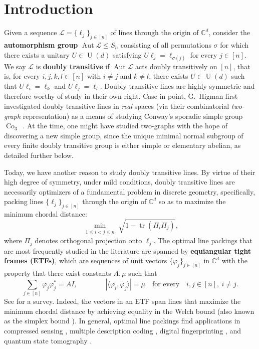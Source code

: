 \documentclass[11pt]{article}
\theoremstyle{definition}
\numberwithin{equation}{section}
\begin{document}
\section{Introduction}


Given a sequence $\mathscr{L} = \{\ell_j\}_{j\in [n]}$ of lines through the origin of $\mathbb{C}^d$, consider the \textbf{automorphism group} $\operatorname{Aut}\mathscr{L} \leq S_n$ consisting of all permutations $\sigma$ for which there exists a unitary $U \in \operatorname{U}(d)$ satisfying $U \ell_j = \ell_{\sigma(j)}$ for every $j \in [n]$.
We say $\mathscr{L}$ is \textbf{doubly transitive} if $\operatorname{Aut} \mathscr{L}$ acts doubly transitively on $[n]$, that is, for every $i,j,k,l\in[n]$ with $i\neq j$ and $k\neq l$, there exists $U\in\operatorname{U}(d)$ such that $U\ell_i=\ell_k$ and $U\ell_j=\ell_l$.
Doubly transitive lines are highly symmetric and therefore worthy of study in their own right.
Case in point, G.~Higman first investigated doubly transitive lines in \textit{real} spaces (via their combinatorial \textit{two-graph} representation) as a means of studying Conway's sporadic simple group $\operatorname{Co}_3$~\cite{Taylor:77}.
At the time, one might have studied two-graphs with the hope of discovering a new simple group, since the unique minimal normal subgroup of every finite doubly transitive group is either simple or elementary abelian, as detailed further below.

Today, we have another reason to study doubly transitive lines.
By virtue of their high degree of symmetry, under mild conditions, doubly transitive lines are necessarily optimizers of a fundamental problem in discrete geometry, specifically, packing lines $\{\ell_j\}_{j\in[n]}$ through the origin of $\mathbb{C}^d$ so as to maximize the minimum chordal distance:
\[
\min_{\substack{1\leq i<j\leq n}}\sqrt{1-\operatorname{tr}(\Pi_i\Pi_j)},
\]
where $\Pi_j$ denotes orthogonal projection onto $\ell_j$.
The optimal line packings that are most frequently studied in the literature are spanned by \textbf{equiangular tight frames (ETFs)}, which are sequences of unit vectors $\{\varphi_j\}_{j\in[n]}$ in $\mathbb{C}^d$ with the property that there exist constants $A,\mu$ such that
\[
\sum_{j\in[n]}\varphi_j\varphi_j^*= A I,
\qquad
\qquad
|\langle \varphi_i,\varphi_j\rangle|= \mu
\quad
\text{for every}
\quad
i,j\in[n],~i\neq j.
\]
See \cite{FickusMixon:table} for a survey.
Indeed, the vectors in an ETF span lines that maximize the minimum chordal distance by achieving equality in the Welch bound \cite{Welch:74} (also known as the simplex bound \cite{ConwayHardinSloane:96}). 
In general, optimal line packings find applications in compressed sensing \cite{BandeiraFickusMixonWong:13}, multiple description coding \cite{StrohmerHeath:03}, digital fingerprinting \cite{MixonQuinnKiyavashFickus:13}, and quantum state tomography \cite{RenesBlumeKohoutScottCaves:04}.
\end{document}
